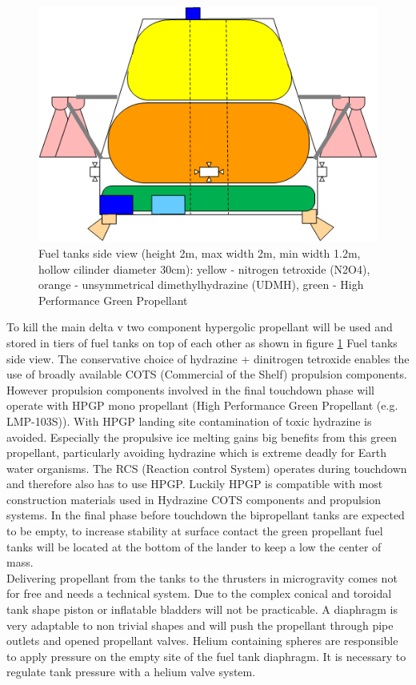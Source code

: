 \begin{figure}[htb]
	\centering
	\includegraphics[width=\textwidth]{Lander/aaronfueltank}
	\caption{Fuel tanks side view (height 2m, max width 2m, min width 1.2m, hollow cilinder diameter 30cm): yellow - nitrogen tetroxide (N2O4), orange - unsymmetrical dimethylhydrazine (UDMH), green - High Performance Green Propellant \label{fig:afuelTank}}
\end{figure}

To kill the main delta v two component hypergolic propellant will be used and stored in tiers of fuel tanks on top of each other as shown in figure \ref{fig:afuelTank} Fuel tanks side view. The conservative choice of hydrazine + dinitrogen tetroxide enables the  use of broadly available COTS (Commercial of the Shelf) propulsion components. However propulsion components involved in the final touchdown phase will operate with HPGP mono propellant (High Performance Green Propellant (e.g. LMP-103S)). With HPGP landing site contamination of toxic hydrazine is avoided. Especially the propulsive ice melting gains big benefits from this green propellant, particularly avoiding hydrazine which is extreme deadly for Earth water organisms. The RCS (Reaction control System) operates during touchdown and therefore also has to use HPGP. Luckily HPGP is compatible with most construction materials used in Hydrazine COTS components and propulsion systems. In the final phase before touchdown the bipropellant tanks are expected to be empty, to increase stability at surface contact the green propellant fuel tanks will be located at the bottom of the lander to keep a low the center of mass.\\
Delivering propellant from the tanks to the thrusters in microgravity comes not for free and needs a technical system. Due to the complex conical and toroidal tank shape piston or inflatable bladders will not be practicable. A diaphragm is very adaptable to non trivial shapes and will push the propellant through pipe outlets and opened propellant valves. Helium containing spheres  are responsible to apply pressure on the empty site of the fuel tank diaphragm. It is necessary to regulate tank pressure with a helium valve system.\\

